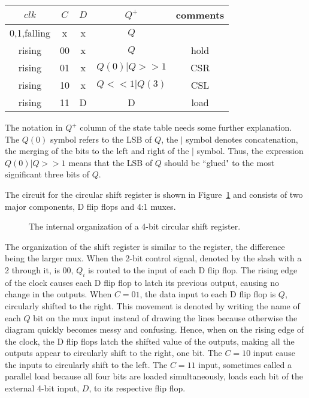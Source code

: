 \begin{tabular}{c|c|c||c||c}

    $clk$          & $C$  & $D$  & $Q^+$     & comments     \\ \hline
    0,1,falling  & x  & x  & $Q$       &        \\ \hline
    rising       & 00 & x  & $Q$       & hold    \\ \hline
    rising       & 01 & x  & $Q(0)|Q>>1$ & CSR    \\ \hline
    rising       & 10 & x  & $Q<<1|Q(3)$ & CSL    \\ \hline
    rising       & 11 & D  & D         & load    \\

\end{tabular}

The notation in $Q^+$ column of the state table needs some further
explanation.  The $Q(0)$ symbol refers to the LSB of $Q$, the $|$ symbol
denotes concatenation, the merging of the bits to the left and right
of the $|$  symbol.  Thus, the expression $Q(0) | Q>>1$ means that the
LSB of $Q$ should be ``glued" to the most significant three bits of
$Q$.

The circuit for the circular shift register is shown in
Figure~\ref{fig:sequentialBBShiftReg} and consists of two major components, D flip
flops and 4:1 muxes.

\begin{figure}[ht]
    \caption{The internal organization of a 4-bit circular shift register.}
    \label{fig:sequentialBBShiftReg}

\end{figure}

The organization of the shift register is similar to the register, the
difference being the larger mux.  When the 2-bit control signal,
denoted by the slash with a 2 through it, is 00, $Q_i$ is routed to
the input of each D flip flop.  The rising edge of the clock
causes each D flip flop to latch its previous output, causing no
change in the outputs.  When $C=01$, the data input to each D flip
flop is $Q$, circularly shifted to the right.  This movement is denoted by
writing the name of each $Q$ bit on the mux input instead of drawing
the lines because otherwise the diagram quickly becomes messy and confusing.
Hence, when on the rising edge of the clock, the D flip flops
latch the shifted value of the outputs, making all the outputs
appear to circularly shift to the right, one bit.  The $C=10$ input
cause the inputs to circularly shift to the left.  The $C=11$ input,
sometimes called a parallel load because all four bits are loaded
simultaneously, loads each bit of the external 4-bit input, $D$, to its
respective flip flop.

